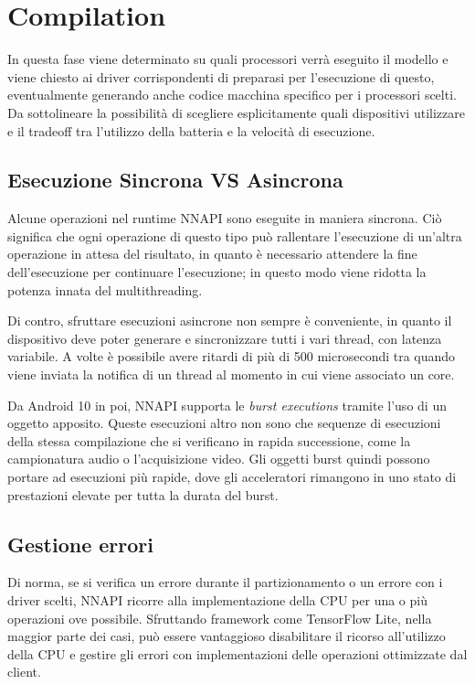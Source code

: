 \section{Compilation}
In questa fase viene determinato su quali processori verrà eseguito il modello e viene chiesto ai driver corrispondenti di preparasi per l’esecuzione di questo, eventualmente generando anche codice macchina specifico per i processori scelti.
Da sottolineare la possibilità di scegliere esplicitamente quali dispositivi utilizzare e il tradeoff tra l’utilizzo della batteria e la velocità di esecuzione.

\subsection{Esecuzione Sincrona VS Asincrona}
Alcune operazioni nel runtime NNAPI sono eseguite in maniera sincrona. Ciò significa che ogni operazione di questo tipo può rallentare l’esecuzione di un'altra operazione in attesa del risultato,
in quanto è necessario attendere la fine dell'esecuzione per continuare l'esecuzione; in questo modo viene ridotta la potenza innata del multithreading.

Di contro, sfruttare esecuzioni asincrone non sempre è conveniente, in quanto il dispositivo deve poter generare e sincronizzare tutti i vari thread, con latenza variabile. A volte è possibile avere ritardi di più di
500 microsecondi tra quando viene inviata la notifica di un thread al momento in cui viene associato un core. 

Da Android 10 in poi, NNAPI supporta le \textit{burst executions} tramite l'uso di un oggetto apposito. Queste esecuzioni altro non sono che sequenze di esecuzioni della stessa compilazione che si verificano in rapida successione,
come la campionatura audio o l’acquisizione video. Gli oggetti burst quindi possono portare ad esecuzioni più rapide, dove gli acceleratori rimangono in uno stato di prestazioni elevate per tutta la durata del burst.

\subsection{Gestione errori}
Di norma, se si verifica un errore durante il partizionamento o un errore con i driver scelti, NNAPI ricorre alla implementazione della CPU per una o più operazioni ove possibile. Sfruttando framework come TensorFlow Lite,
nella maggior parte dei casi, può essere vantaggioso disabilitare il ricorso all'utilizzo della CPU e gestire gli errori con implementazioni delle operazioni ottimizzate dal client.

